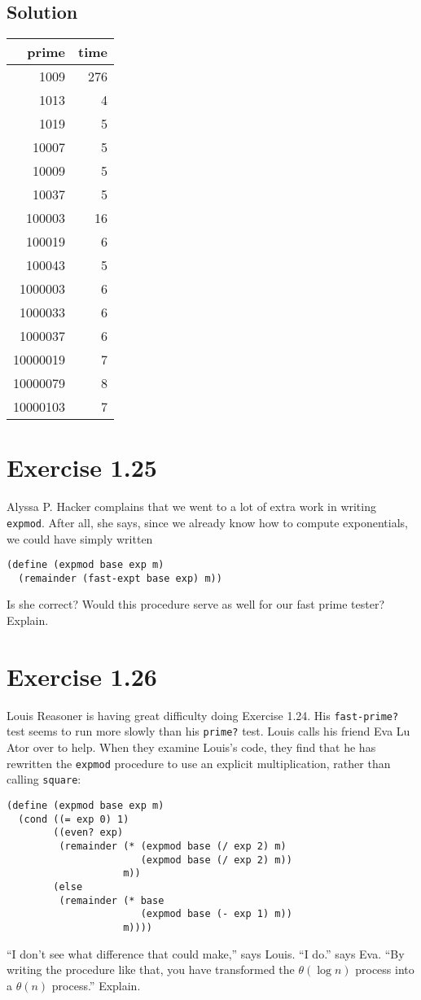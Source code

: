 \documentclass[11pt]{article}
\begin{document}
\subsection{Solution}
\label{sec:org4124d2f}
\begin{center}
\begin{tabular}{rr}
prime & time\\
\hline
1009 & 276\\
1013 & 4\\
1019 & 5\\
10007 & 5\\
10009 & 5\\
10037 & 5\\
100003 & 16\\
100019 & 6\\
100043 & 5\\
1000003 & 6\\
1000033 & 6\\
1000037 & 6\\
10000019 & 7\\
10000079 & 8\\
10000103 & 7\\
\end{tabular}
\end{center}
\section{Exercise 1.25}
\label{sec:orga53046e}
Alyssa P. Hacker complains that we went to a lot of extra work in writing
\texttt{expmod}. After all, she says, since we already know how to compute
exponentials, we could have simply written
\begin{verbatim}
(define (expmod base exp m)
  (remainder (fast-expt base exp) m))
\end{verbatim}
Is she correct? Would this procedure serve as well for our fast prime tester?
Explain.
\section{Exercise 1.26}
\label{sec:orgec7b09d}
Louis Reasoner is having great difficulty doing Exercise 1.24. His
\texttt{fast-prime?} test seems to run more slowly than his \texttt{prime?} test. Louis
calls his friend Eva Lu Ator over to help. When they examine Louis’s code,
they find that he has rewritten the \texttt{expmod} procedure to use an explicit
multiplication, rather than calling \texttt{square}:
\begin{verbatim}
(define (expmod base exp m)
  (cond ((= exp 0) 1)
        ((even? exp)
         (remainder (* (expmod base (/ exp 2) m)
                       (expmod base (/ exp 2) m))
                    m))
        (else
         (remainder (* base
                       (expmod base (- exp 1) m))
                    m))))
\end{verbatim}
``I don't see what difference that could make,'' says Louis. ``I do.'' says
Eva. ``By writing the procedure like that, you have transformed the \(\theta(\log n)\) process into a \(\theta(n)\) process.'' Explain.
\end{document}
